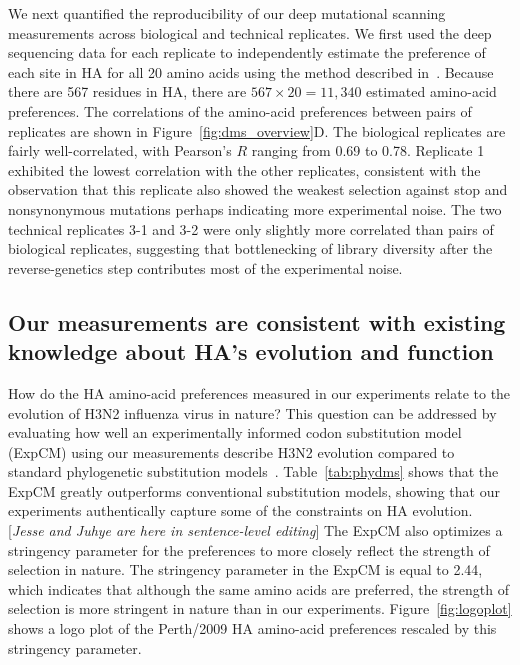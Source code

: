 \documentclass[9pt,twocolumn,twoside]{pnas-new}
\newcommand{\comment}[1]{{\color{red}[\textsl{#1}]}}
\begin{document}
We next quantified the reproducibility of our deep mutational scanning measurements across biological and technical replicates. 
We first used the deep sequencing data for each replicate to independently estimate the preference of each site in HA for all 20 amino acids using the method described in~\cite{bloom2015software}.
Because there are 567 residues in HA, there are $567 \times 20 = 11,340$ estimated amino-acid preferences.
The correlations of the amino-acid preferences between pairs of replicates are shown in Figure~\ref{fig:dms_overview}D.
The biological replicates are fairly well-correlated, with Pearson's $R$ ranging from 0.69 to 0.78. 
Replicate 1 exhibited the lowest correlation with the other replicates, consistent with the observation that this replicate also showed the weakest selection against stop and nonsynonymous mutations perhaps indicating more experimental noise.
The two technical replicates 3-1 and 3-2 were only slightly more correlated than pairs of biological replicates, suggesting that bottlenecking of library diversity after the reverse-genetics step contributes most of the experimental noise.

\subsection*{Our measurements are consistent with existing knowledge about HA's evolution and function}
How do the HA amino-acid preferences measured in our experiments relate to the evolution of H3N2 influenza virus in nature?
This question can be addressed by evaluating how well an experimentally informed codon substitution model (ExpCM) using our measurements describe H3N2 evolution compared to standard phylogenetic substitution models~\cite{hilton2017phydms}.
Table~\ref{tab:phydms} shows that the ExpCM greatly outperforms conventional substitution models, showing that our experiments authentically capture some of the constraints on HA evolution. 
\comment{Jesse and Juhye are here in sentence-level editing} 
The ExpCM also optimizes a stringency parameter for the preferences to more closely reflect the strength of selection in nature.
The stringency parameter in the ExpCM is equal to 2.44, which indicates that although the same amino acids are preferred, the strength of selection is more stringent in nature than in our experiments.
Figure~\ref{fig:logoplot} shows a logo plot of the Perth/2009 HA amino-acid preferences rescaled by this stringency parameter.
\end{document}
